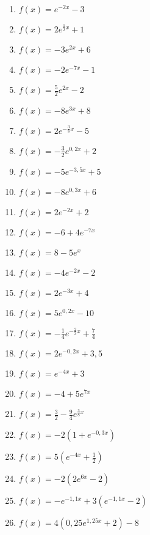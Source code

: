\begin{Exercise}[title={Bestimme den y-Achsenabschnitt, skizziere das Schaubild, gib die Asymptote, das Verhalten für \(x\rightarrow \pm\infty\) und die Monotonie an}, label=eFktA2]

	\begin{minipage}{\textwidth}
		\begin{minipage}{0.5\textwidth}
			\begin{enumerate}[label=\alph*)]
				\item \(f(x)=e^{-2x}-3\)
				\item \(f(x)=2e^{\frac{1}{2}x}+1\)
				\item \(f(x)=-3e^{2x}+6\)
				\item \(f(x)=-2e^{-7x}-1\)
				\item \(f(x)=\frac{5}{2}e^{2x}-2\)
				\item \(f(x)=-8e^{3x}+8\)
				\item \(f(x)=2e^{-\frac{3}{8}x}-5\)
				\item \(f(x)=-\frac{3}{2}e^{0,2x}+2\)
				\item \(f(x)=-5e^{-3,5x}+5\)
				\item \(f(x)=-8e^{0,3x}+6\)
				\item \(f(x)=2e^{-2x}+2\)
				\item \(f(x)=-6+4e^{-7x}\)
				\item \(f(x)=8-5e^{x}\)
			\end{enumerate}
		\end{minipage}%
		\begin{minipage}{0.5\textwidth}
			\begin{enumerate}[label=\alph*)]
				\setcounter{enumi}{13}
				\item \(f(x)=-4e^{-2x}-2\)
				\item \(f(x)=2e^{-3x}+4\)
				\item \(f(x)=5e^{0,2x}-10\)
				\item \(f(x)=-\frac{1}{4}e^{-\frac{2}{3}x}+\frac{7}{4}\)
                \item \(f(x)=2e^{-0,2x}+3,5\)
				\item \(f(x)=e^{-4x}+3\)
				\item \(f(x)=-4+5e^{7x}\)
				\item \(f(x)=\frac{3}{2}-\frac{9}{4}e^{\frac{3}{8}x}\)
				\item \(f(x)=-2\left(1+e^{-0,3x}\right) \)
				\item \(f(x)=5\left(e^{-4x}+\frac{1}{2}\right) \)
				\item \(f(x)=-2\left( 2e^{6x}-2\right) \)
				\item \(f(x)=-e^{-1,1x}+3\left(e^{-1,1x}-2\right)\)
				\item \(f(x)=4\left( 0,25e^{1,25x}+2\right) -8\)
			\end{enumerate}
		\end{minipage}%
	\end{minipage}
\end{Exercise}
